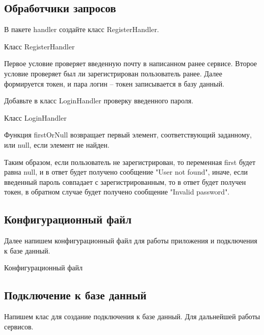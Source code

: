 \subsection{Обработчики запросов}

В пакете handler создайте класс RegisterHandler.

\begin{image}
	\caption{Класс RegisterHandler}
    \label{fig:registerhandler}
\end{image}

Первое условие проверяет введенную почту в написанном ранее сервисе.
Второе условие проверяет был ли зарегистрирован пользователь ранее.
Далее формируется токен, и пара логин -- токен записывается в базу данный.\par
Добавьте в класс LoginHandler проверку введенного пароля.

\begin{image}
	\caption{Класс LoginHandler}
    \label{fig:loginhandler}
\end{image}

Функция firstOrNull возвращает первый элемент, соответствующий
заданному, или null, если элемент не найден.\par
Таким образом, если пользователь не зарегистрирован, то переменная
first будет равна null, и в ответ будет получено сообщение "User not found",
иначе, если введенный пароль совпадает с зарегистрированным, то в ответ
будет получен токен, в обратном случае будет получено сообщение "Invalid
password".

\subsection{Конфигурационный файл}

Далее напишем конфигурационный файл для работы приложения
и подключения к базе данный.

\begin{image}
	\caption{Конфигурационный файл}
    \label{fig:configfile}
\end{image}

\subsection{Подключение к базе данный}

Напишем клас для создание подключения к базе данный.
Для дальнейшей работы сервисов.

